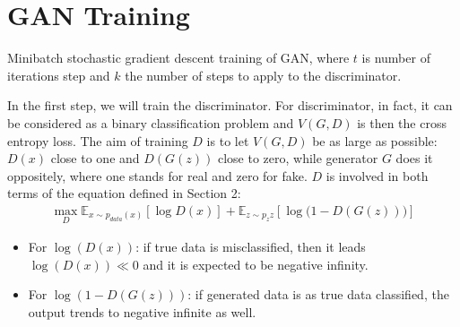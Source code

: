 \documentclass[10pt,twocolumn,letterpaper]{article}
\begin{document}
\section{GAN Training}
\begin{algorithm}[!h]  
\caption{Minibatch stochastic gradient descent\cite{ketkar2017stochastic} training of GAN, where $t$ is number of iterations step and $k$ the number of steps to apply to the discriminator. }  \begin{algorithmic}[1]%
    \ENDFOR
\ENDFOR
\end{algorithmic}
\end{algorithm}

In the first step, we will train the discriminator. For discriminator, in fact, it can be considered as a binary classification problem and $V(G,D)$ is then the cross entropy loss. The aim of training $D$ is to let $V(G,D)$ be as large as possible: $D(x)$ close to one and $D(G(z))$ close to zero, while generator $G$ does it oppositely, where one stands for real and zero for fake. $D$ is involved in both terms of the equation defined in Section 2:
\begin{align*}
    \max\limits_D\mathbb{E}_{x \sim p_{data}(x)}[\log{D(x)}] + \mathbb{E}_{z \sim p_z{z}}[\log{\big(1 - D(G(z))\big)}]
\end{align*}
\begin{itemize}
    \item For $\log(D(x))$: if true data is misclassified, then it leads $\log(D(x)) \ll 0$ and it is expected to be negative infinity.
    \item For $\log(1-D(G(z)))$: if generated data is as true data classified, the output trends to negative infinite as well.  
\end{itemize}
\end{document}
